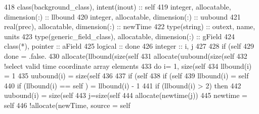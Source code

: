 \begin{DoxyCode}
418     \textcolor{keywordtype}{class}(background\_class), \textcolor{keywordtype}{intent(inout)} :: self
419     \textcolor{keywordtype}{integer}, \textcolor{keywordtype}{allocatable}, \textcolor{keywordtype}{dimension(:)} :: llbound
420     \textcolor{keywordtype}{integer}, \textcolor{keywordtype}{allocatable}, \textcolor{keywordtype}{dimension(:)} :: uubound
421     \textcolor{keywordtype}{real(prec)}, \textcolor{keywordtype}{allocatable}, \textcolor{keywordtype}{dimension(:)} :: newTime
422     \textcolor{keywordtype}{type}(string) :: outext, name, units
423     \textcolor{keywordtype}{type}(generic\_field\_class), \textcolor{keywordtype}{allocatable}, \textcolor{keywordtype}{dimension(:)} :: gField
424     \textcolor{keywordtype}{class}(*), \textcolor{keywordtype}{pointer} :: aField
425     \textcolor{keywordtype}{logical} :: done
426     \textcolor{keywordtype}{integer} :: i, j
427 
428     \textcolor{keywordflow}{if} (self%
429         done = .false.
430         \textcolor{keyword}{allocate}(llbound(\textcolor{keyword}{size}(self%
431         \textcolor{keyword}{allocate}(uubound(\textcolor{keyword}{size}(self%
432         \textcolor{comment}{!select valid time coordinate array elements}
433         \textcolor{keywordflow}{do} i= 1, \textcolor{keyword}{size}(self%
434             llbound(i) = 1
435             uubound(i) = \textcolor{keyword}{size}(self%
436 
437             \textcolor{keywordflow}{if} (self%
438                 \textcolor{keywordflow}{if} (self%
439                     llbound(i) = self%
440                     \textcolor{keywordflow}{if} (llbound(i) == self%
      ) = llbound(i) - 1
441                     \textcolor{keywordflow}{if} (llbound(i) > 2) \textcolor{keywordflow}{then}
442                         uubound(i) = \textcolor{keyword}{size}(self%
443                         j=\textcolor{keyword}{size}(self%
444                         \textcolor{keyword}{allocate}(newtime(j))
445                         newtime = self%
446                         \textcolor{comment}{!allocate(newTime, source = self%
}
\end{DoxyCode}
